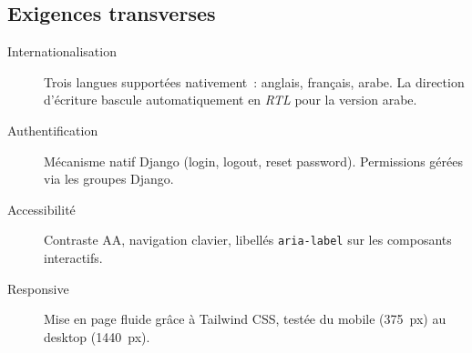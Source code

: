 \subsection{Exigences transverses}

\begin{description}
    \item[Internationalisation] Trois langues supportées
    nativement~: anglais, français, arabe. La direction d'écriture bascule
    automatiquement en \emph{RTL} pour la version arabe.
    \item[Authentification] Mécanisme natif Django (login, logout, reset
    password). Permissions gérées via les groupes Django.
    \item[Accessibilité] Contraste AA, navigation clavier, libellés
    \texttt{aria-label} sur les composants interactifs.
    \item[Responsive] Mise en page fluide grâce à Tailwind CSS, testée du
    mobile (375~px) au desktop (1440~px).
\end{description}
